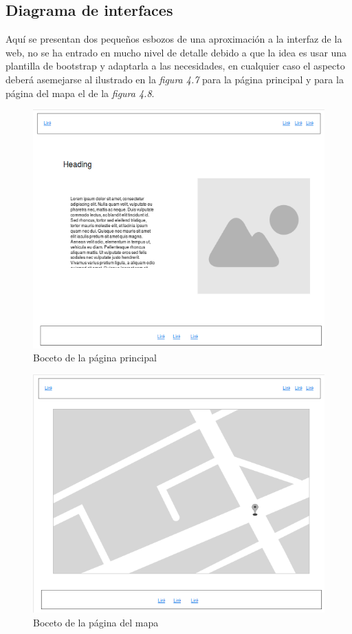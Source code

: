\newpage

\subsection{Diagrama de interfaces}

Aquí se presentan dos pequeños esbozos de una aproximación a la interfaz de la web, no se ha entrado en mucho nivel de detalle debido a que la idea es usar una plantilla de bootstrap y adaptarla a las necesidades, en cualquier caso el aspecto deberá asemejarse al ilustrado en la \textit{figura 4.7} para la página principal y para la página del mapa el de la \textit{figura 4.8}.

\begin{figure}[!ht]
  \begin{center}
  \includegraphics[scale=0.7]{../images/diag_plan/ui_general.png}
  \caption{Boceto de la página principal}
  \label{fig:ar_rsmap}
  \end{center}
\end{figure}

\begin{figure}[!ht]
  \begin{center}
  \includegraphics[scale=0.7]{../images/diag_plan/ui_mapa.png}
  \caption{Boceto de la página del mapa}
  \label{fig:ar_rsmap}
  \end{center}
\end{figure}
